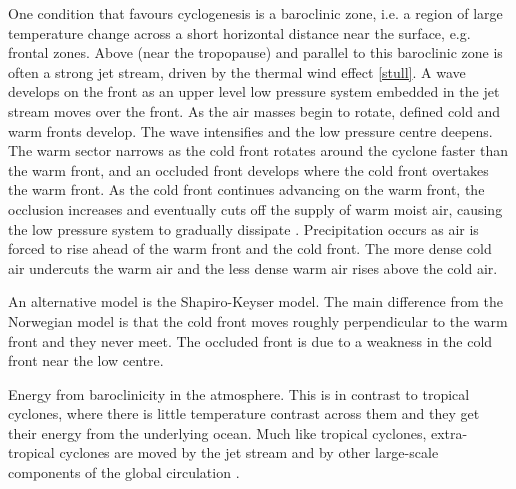 One condition that favours cyclogenesis is a baroclinic zone, i.e. a region of large temperature change across a short horizontal distance near the surface, e.g. frontal zones. Above (near the tropopause) and parallel to this baroclinic zone is often a strong jet stream, driven by the thermal wind effect \ref{stull}. A wave develops on the front as an upper level low pressure system embedded in the jet stream moves over the front. As the air masses begin to rotate, defined cold and warm fronts develop. The wave intensifies and the low pressure centre deepens. The warm sector narrows as the cold front rotates around the cyclone faster than the warm front, and an occluded front develops where the cold front overtakes the warm front. As the cold front continues advancing on the warm front, the occlusion increases and eventually cuts off the supply of warm moist air, causing the low pressure system to gradually dissipate \citep{norwegian}. Precipitation occurs as air is forced to rise ahead of the warm front and the cold front. The more dense cold air undercuts the warm air and the less dense warm air rises above the cold air.


An alternative model is the Shapiro-Keyser model. The main difference from the Norwegian model is that the cold front moves roughly perpendicular to the warm front and they never meet. The occluded front is due to a weakness in the cold front near the low centre.


Energy from baroclinicity in the atmosphere. This is in contrast to tropical cyclones, where there is little temperature contrast across them and they get their energy from the underlying ocean. Much like tropical cyclones, extra-tropical cyclones are moved by the jet stream and by other large-scale components of the global circulation \citep{stull}.

